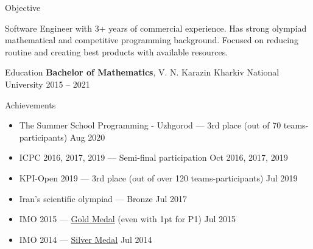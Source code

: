 \documentclass{resume} %
\begin{document}

\begin{rSection}{Objective}

Software Engineer with 3+ years of commercial experience.
Has strong olympiad mathematical and competitive programming background.
Focused on reducing routine and creating best products with available resources.

\end{rSection}

\begin{rSection}{Education}
{\bf Bachelor of Mathematics}, V. N. Karazin Kharkiv National University \hfill {2015 -- 2021}

\end{rSection}

\begin{rSection}{Achievements}
\begin{itemize}
    \itemsep -3pt
    \item The Summer School Programming - Uzhgorod --- 3rd place (out of 70 teams-participants)    \hfill Aug 2020
    \item ICPC 2016, 2017, 2019 --- Semi-final participation    \hfill Oct 2016, 2017, 2019
    \item KPI-Open 2019 --- 3rd place (out of over 120 teams-participants)   \hfill Jul 2019
    \item Iran's scientific olympiad --- Bronze                 \hfill Jul 2017
    \item IMO 2015 --- \href{https://www.imo-official.org/participant_r.aspx?id=25121}{Gold Medal} (even with 1pt for P1)        \hfill Jul 2015
    \item IMO 2014 --- \href{https://www.imo-official.org/participant_r.aspx?id=25121}{Silver Medal}        \hfill Jul 2014
\end{itemize}
\end{rSection}
\end{document}
